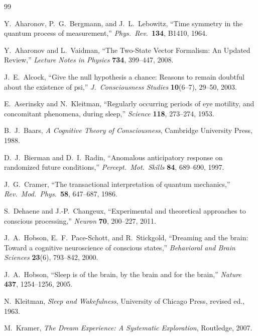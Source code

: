 \documentclass[11pt, a4paper]{article}
\theoremstyle{definition}
\theoremstyle{remark}
\begin{document}
\begin{thebibliography}{99}

Y.~Aharonov, P.~G.~Bergmann, and J.~L.~Lebowitz,
``Time symmetry in the quantum process of measurement,''
\textit{Phys.\ Rev.}\ \textbf{134}, B1410, 1964.

Y.~Aharonov and L.~Vaidman,
``The Two-State Vector Formalism: An Updated Review,''
\textit{Lecture Notes in Physics} \textbf{734}, 399--447, 2008.

J.~E.~Alcock,
``Give the null hypothesis a chance: Reasons to remain doubtful
about the existence of psi,''
\textit{J.\ Consciousness Studies} \textbf{10}(6--7), 29--50, 2003.

E.~Aserinsky and N.~Kleitman,
``Regularly occurring periods of eye motility, and concomitant
phenomena, during sleep,''
\textit{Science} \textbf{118}, 273--274, 1953.

B.~J.~Baars,
\textit{A Cognitive Theory of Consciousness},
Cambridge University Press, 1988.

D.~J.~Bierman and D.~I.~Radin,
``Anomalous anticipatory response on randomized future
conditions,''
\textit{Percept.\ Mot.\ Skills} \textbf{84}, 689--690, 1997.

J.~G.~Cramer,
``The transactional interpretation of quantum mechanics,''
\textit{Rev.\ Mod.\ Phys.}\ \textbf{58}, 647--687, 1986.

S.~Dehaene and J.-P.~Changeux,
``Experimental and theoretical approaches to conscious processing,''
\textit{Neuron} \textbf{70}, 200--227, 2011.

J.~A.~Hobson, E.~F.~Pace-Schott, and R.~Stickgold,
``Dreaming and the brain: Toward a cognitive neuroscience of
conscious states,''
\textit{Behavioral and Brain Sciences} \textbf{23}(6), 793--842,
2000.

J.~A.~Hobson,
``Sleep is of the brain, by the brain and for the brain,''
\textit{Nature} \textbf{437}, 1254--1256, 2005.

N.~Kleitman,
\textit{Sleep and Wakefulness},
University of Chicago Press, revised ed., 1963.

M.~Kramer,
\textit{The Dream Experience: A Systematic Exploration},
Routledge, 2007.


\end{thebibliography}
\end{document}
